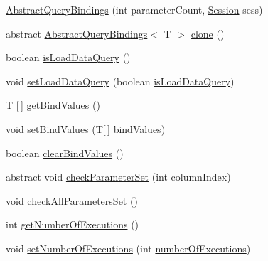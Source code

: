 \begin{DoxyCompactItemize}
\item 
\mbox{\hyperlink{classcom_1_1mysql_1_1cj_1_1_abstract_query_bindings_a6e32b58cbbe788daf51ceb4b1dbab116}{Abstract\+Query\+Bindings}} (int parameter\+Count, \mbox{\hyperlink{interfacecom_1_1mysql_1_1cj_1_1_session}{Session}} sess)
\item 
abstract \mbox{\hyperlink{classcom_1_1mysql_1_1cj_1_1_abstract_query_bindings}{Abstract\+Query\+Bindings}}$<$ T $>$ \mbox{\hyperlink{classcom_1_1mysql_1_1cj_1_1_abstract_query_bindings_a0255791ce812a85734cae2a60d2ec798}{clone}} ()
\item 
boolean \mbox{\hyperlink{classcom_1_1mysql_1_1cj_1_1_abstract_query_bindings_a7b212748e0698fa97ecee6ef3f8fb6d5}{is\+Load\+Data\+Query}} ()
\item 
void \mbox{\hyperlink{classcom_1_1mysql_1_1cj_1_1_abstract_query_bindings_a4e14e1142386e82268bac20d253451c6}{set\+Load\+Data\+Query}} (boolean \mbox{\hyperlink{classcom_1_1mysql_1_1cj_1_1_abstract_query_bindings_ae057e7a1b56daa198a730198f3040523}{is\+Load\+Data\+Query}})
\item 
T \mbox{[}$\,$\mbox{]} \mbox{\hyperlink{classcom_1_1mysql_1_1cj_1_1_abstract_query_bindings_a7af74acdf60a682d5fa7f9278aa37e4e}{get\+Bind\+Values}} ()
\item 
void \mbox{\hyperlink{classcom_1_1mysql_1_1cj_1_1_abstract_query_bindings_a0c455ee3707e8c6b44ab216d195862a1}{set\+Bind\+Values}} (T\mbox{[}$\,$\mbox{]} \mbox{\hyperlink{classcom_1_1mysql_1_1cj_1_1_abstract_query_bindings_a89ff142df297b89a337489fe8f4e0266}{bind\+Values}})
\item 
boolean \mbox{\hyperlink{classcom_1_1mysql_1_1cj_1_1_abstract_query_bindings_a5df13f93e579f0771b6515ae24bd26c4}{clear\+Bind\+Values}} ()
\item 
abstract void \mbox{\hyperlink{classcom_1_1mysql_1_1cj_1_1_abstract_query_bindings_a0df45abda5a160a740ff9206f3f05f7a}{check\+Parameter\+Set}} (int column\+Index)
\item 
void \mbox{\hyperlink{classcom_1_1mysql_1_1cj_1_1_abstract_query_bindings_a7e9658d2e8bcf61a2e0a7b020d31e2ee}{check\+All\+Parameters\+Set}} ()
\item 
int \mbox{\hyperlink{classcom_1_1mysql_1_1cj_1_1_abstract_query_bindings_afd9bf3e5bb4ecf783818274f798be6e8}{get\+Number\+Of\+Executions}} ()
\item 
void \mbox{\hyperlink{classcom_1_1mysql_1_1cj_1_1_abstract_query_bindings_a2f4900412aa5d9ea460e8d246d45a85a}{set\+Number\+Of\+Executions}} (int \mbox{\hyperlink{classcom_1_1mysql_1_1cj_1_1_abstract_query_bindings_afc729305171e8a1cf48109919d7a7e33}{number\+Of\+Executions}})

\end{DoxyCompactItemize}
